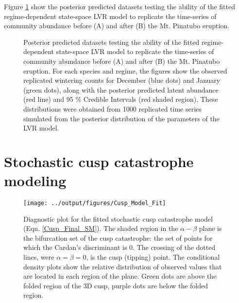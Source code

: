 \documentclass[11pt]{article}
\begin{document}
Figure \ref{fig:PPC} show the posterior predicted datasets testing the ability of the fitted regime-dependent state-space LVR model to replicate the time-series of community abundance before (A) and after (B) the Mt. Pinatubo eruption.

\renewcommand{\thefigure}{S3}
\begin{figure}[htbp]
	\centering
	\qquad
	\caption{Posterior predicted datasets testing the ability of the fitted regime-dependent state-space LVR model to replicate the time-series of community abundance before (A) and after (B) the Mt. Pinatubo eruption. For each species and regime, the figures show the observed replicated wintering counts for December (blue dots) and January (green dots), along with the posterior predicted latent abundance (red line) and 95 \% Credible Intervals (red shaded region). These distributions were obtained from 1000 replicated time series simulated from the posterior distribution of the parameters of the LVR model. }%
	\label{fig:PPC}%
\end{figure}

\section{Stochastic cusp catastrophe modeling}

\renewcommand{\thefigure}{S4}
\begin{figure}[h!]
	\centering
	\texttt{[image: ../output/figures/Cusp\_Model\_Fit]}
	\caption[Diagnostic plot for the fitted stochastic cusp catastrophe model]{Diagnostic plot for the fitted stochastic cusp catastrophe model (Eqn. \ref{Cusp_Final_SM}). The shaded region in the  $ \alpha-\beta $ plane is the bifurcation set of the cusp catastrophe: the set of points for which the Cardan's discriminant is 0. The crossing of the dotted lines, were $ \alpha = \beta = 0 $, is the cusp (tipping) point. The conditional density plots show the relative distribution of observed values that are located in each region of the plane. Green dots are above the folded region of the 3D cusp, purple dots are below the folded region.}
	\label{fig:Cusp_Model_Fit}
\end{figure}
\end{document}
